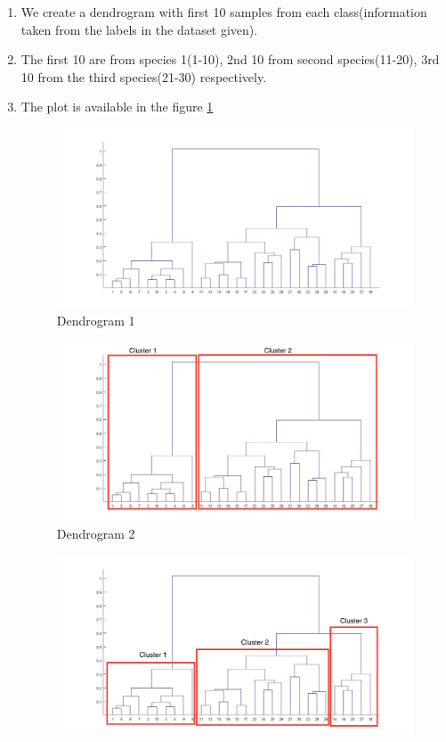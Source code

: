 \documentclass[10pt, letterpaper]{article}
\begin{document}
\begin{enumerate}
\begin{enumerate}
\item We create a dendrogram with first 10 samples from each class(information taken from the labels in the dataset given). 
\item The first 10 are from species 1(1-10), 2nd 10 from second species(11-20), 3rd 10 from the third species(21-30) respectively.
\item The plot is available in the figure \ref{fig:dend1}
	\begin{figure}[h!]
	\centering
	\includegraphics[scale=0.45]{Dendrogram}
	\caption{Dendrogram 1}
	\label{fig:dend1}
	\end{figure}
	\begin{figure}[h!]
	\centering
	\includegraphics[scale=0.45]{Dendrogram_1}
	\caption{Dendrogram 2}
	\label{fig:dend2}
	\end{figure}
	\begin{figure}[h!]
	\centering
	\includegraphics[scale=0.45]{Dendrogram_2}

\end{figure}
\end{enumerate}
\end{enumerate}
\end{document}
